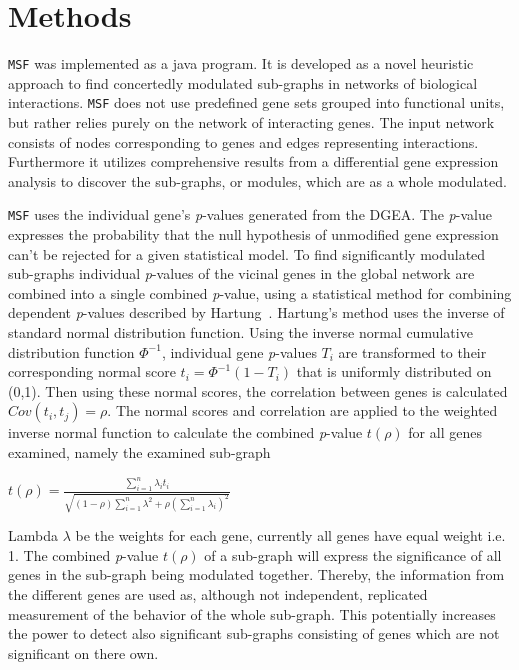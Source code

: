 \documentclass[10pt,a4paper,twocolumn]{article}
\begin{document}
	
	
	
	\section*{Methods}
	
	\texttt{MSF} was implemented as a java program. It is developed as a novel heuristic approach to find concertedly
	modulated sub-graphs in networks of biological interactions.  \texttt{MSF}
	does not use predefined gene sets grouped into functional units, but rather
	relies purely on the network of interacting genes. The input network
	consists of nodes corresponding to genes and edges representing
	interactions. Furthermore it utilizes comprehensive results from a
	differential gene expression analysis to discover the sub-graphs, or
	modules, which are as a whole modulated.
	
	\texttt{MSF} uses the individual gene's \textit{p}-values generated from
	the DGEA. The \textit{p}-value expresses the probability that the null
	hypothesis of unmodified gene expression can't be rejected for a given
	statistical model. To find significantly modulated sub-graphs individual
	\textit{p}-values of the vicinal genes in the global network are combined
	into a single combined \textit{p}-value, using a statistical method for
	combining dependent \textit{p}-values described by
	Hartung~\cite{Hartung}. Hartung's method uses the inverse of standard
	normal distribution function. Using the inverse normal cumulative distribution function $\Phi^{-1}$, individual gene \textit{p}-values $T_{i}$ are 
	transformed to their corresponding normal score $t_{i}=\Phi^{-1}(1-T_{i})$ that is uniformly distributed on (0,1). Then using these normal
	scores, the correlation between genes is calculated $Cov(t_{i},t_{j})=\rho$. The normal scores and
	correlation are applied to the weighted inverse normal function to calculate the
	combined \textit{p}-value $t(\rho)$ for all genes examined, namely the examined
	sub-graph
	\newline
	\begin{center}
		$t(\rho)=\frac{\sum_{i=1}^{n}\lambda_i t_{i} }{\sqrt{(1-\rho) \sum_{i=1}^{n} \lambda^{2}+\rho(\sum_{i=1}^{n} \lambda_i)^{2}}}$
	\end{center}
	
	Lambda $\lambda$ be the weights for each gene, currently all genes have equal weight i.e. 1. The combined \textit{p}-value  $t(\rho)$ of a sub-graph will express the
	significance of all genes in the sub-graph being modulated
	together. Thereby, the information from the different genes are used as,
	although not independent, replicated measurement of the behavior of the
	whole sub-graph. This potentially increases the power to detect also
	significant sub-graphs consisting of genes which are not significant on
	there own.
	\newline
	
\end{document}
